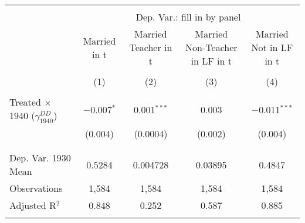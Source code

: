 
\begin{tabular}{@{\extracolsep{5pt}}lcccc} 
\\[-1.8ex]\hline 
\hline \\[-1.8ex] 
 & \multicolumn{4}{c}{Dep. Var.: fill in by panel} \\ 
\cline{2-5} 
 & Married in t & Married Teacher in t & Married Non-Teacher in LF in t & Married Not in LF in t \\ 
\\[-1.8ex] & (1) & (2) & (3) & (4)\\ 
\hline \\[-1.8ex] 
 Treated $\times$ 1940 ($\gamma_{1940}^{DD}$) & $-$0.007$^{*}$ & 0.001$^{***}$ & 0.003 & $-$0.011$^{***}$ \\ 
  & (0.004) & (0.0004) & (0.002) & (0.004) \\ 
  & & & & \\ 
\hline \\[-1.8ex] 
Dep. Var. 1930 Mean & 0.5284 & 0.004728 & 0.03895 & 0.4847 \\ 
Observations & 1,584 & 1,584 & 1,584 & 1,584 \\ 
Adjusted R$^{2}$ & 0.848 & 0.252 & 0.587 & 0.885 \\ 
\hline 
\hline \\[-1.8ex] 
\end{tabular} 
